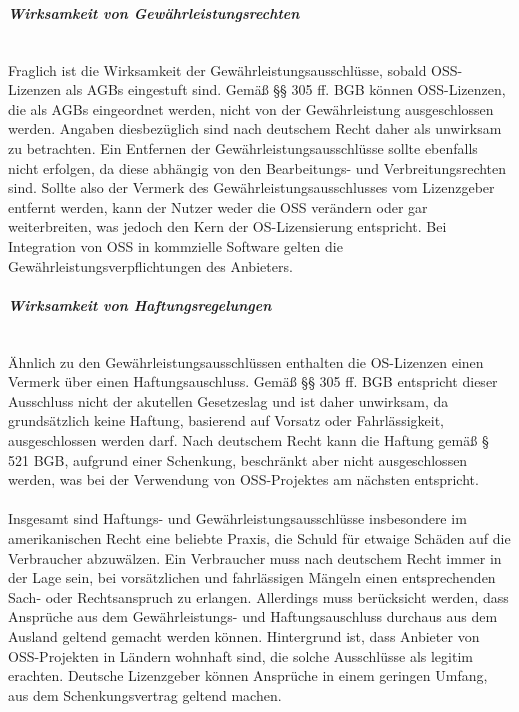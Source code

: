 \subparagraph{Wirksamkeit von Gewährleistungsrechten}$~$

Fraglich ist die Wirksamkeit der Gewährleistungsausschlüsse, sobald OSS-Lizenzen als AGBs eingestuft sind. Gemäß §§ 305 ff. BGB können OSS-Lizenzen, die als AGBs eingeordnet werden, nicht von der Gewährleistung ausgeschlossen werden. Angaben diesbezüglich sind nach deutschem Recht daher als unwirksam zu betrachten. Ein Entfernen der Gewährleistungsausschlüsse sollte ebenfalls nicht erfolgen, da diese abhängig von den Bearbeitungs- und Verbreitungsrechten sind. \cite[S. 71]{bitkom_open_2016} Sollte also der Vermerk des Gewährleistungsausschlusses vom Lizenzgeber entfernt werden, kann der Nutzer weder die OSS verändern oder gar weiterbreiten, was jedoch den Kern der OS-Lizensierung entspricht. Bei Integration von OSS in kommzielle Software gelten die Gewährleistungsverpflichtungen des Anbieters. \cite[S. 71]{bitkom_open_2016}

\subparagraph{Wirksamkeit von Haftungsregelungen}$~$

Ähnlich zu den Gewährleistungsausschlüssen enthalten die OS-Lizenzen einen Vermerk über einen Haftungsauschluss. Gemäß §§ 305 ff. BGB entspricht dieser Ausschluss nicht der akutellen Gesetzeslag und ist daher unwirksam, da grundsätzlich keine Haftung, basierend auf Vorsatz oder Fahrlässigkeit, ausgeschlossen werden darf. Nach deutschem Recht kann die Haftung gemäß § 521 BGB, aufgrund einer Schenkung, beschränkt aber nicht ausgeschlossen werden, was bei der Verwendung von OSS-Projektes am nächsten entspricht. \cite[S. 71]{bitkom_open_2016} \\\\

Insgesamt sind Haftungs- und Gewährleistungsausschlüsse insbesondere im amerikanischen Recht eine beliebte Praxis, die Schuld für etwaige Schäden auf die Verbraucher abzuwälzen. Ein Verbraucher muss nach deutschem Recht immer in der Lage sein, bei vorsätzlichen und fahrlässigen Mängeln einen entsprechenden Sach- oder Rechtsanspruch zu erlangen. Allerdings muss berücksicht werden, dass Ansprüche aus dem Gewährleistungs- und Haftungsauschluss durchaus aus dem Ausland geltend gemacht werden können. \cite[S. 48]{schaaf_open-source-lizenzen_2013}Hintergrund ist, dass Anbieter von OSS-Projekten in Ländern wohnhaft sind, die solche Ausschlüsse als legitim erachten. Deutsche Lizenzgeber können Ansprüche in einem geringen Umfang, aus dem Schenkungsvertrag geltend machen. 

